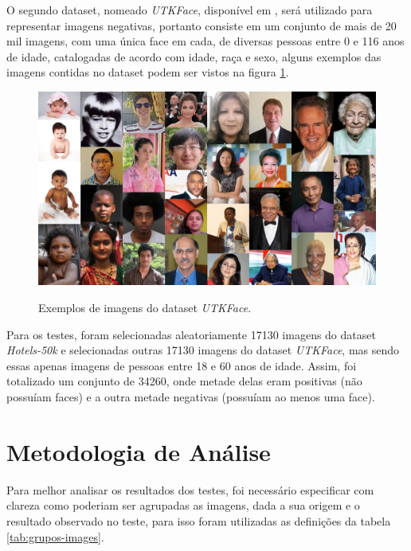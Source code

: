 O segundo dataset, nomeado \textit{UTKFace}, disponível em , será utilizado para representar imagens negativas, portanto consiste em um conjunto de mais de 20 mil imagens, com uma única face em cada, de diversas pessoas entre 0 e 116 anos de idade, catalogadas de acordo com idade, raça e sexo, alguns exemplos das imagens contidas no dataset podem ser vistos na figura \ref{fig:exemplos-utk}.

\begin{figure}[htb]
    \centering
    \caption{Exemplos de imagens do dataset \textit{UTKFace}.}
    \includegraphics[scale=.3]{figs/exemplos-utk.png}
    \label{fig:exemplos-utk}
 \end{figure}

 Para os testes, foram selecionadas aleatoriamente 17130 imagens do dataset \textit{Hotels-50k} e selecionadas outras 17130 imagens do dataset \textit{UTKFace}, mas sendo essas apenas imagens de pessoas entre 18 e 60 anos de idade. Assim, foi totalizado um conjunto de 34260, onde metade delas eram positivas (não possuíam faces) e a outra metade negativas (possuíam ao menos uma face).

\section{Metodologia de Análise}

Para melhor analisar os resultados dos testes, foi necessário especificar com clareza como poderiam ser agrupadas as imagens, dada a sua origem e o resultado observado no teste, para isso foram utilizadas as definições da tabela \ref{tab:grupos-images}. 

